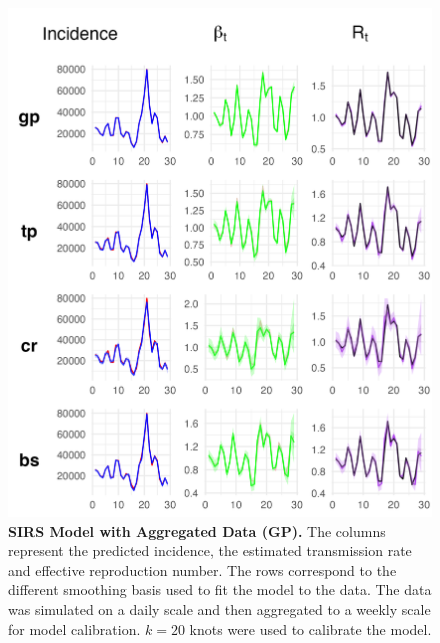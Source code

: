 \documentclass[
11pt, %
oneside, %
english, %
singlespacing, %
]{macthesis} %
\begin{document}
\begin{figure}[H]
\centering
\includegraphics[width=\textwidth]{figure/Simulated/aggregated/sim_agg_combined_gp.png}
\caption[SIRS model with aggregated data (GP).]{\textbf{SIRS Model with Aggregated Data (GP).} The columns represent the predicted incidence, the estimated transmission rate and effective reproduction number. The rows correspond to the different smoothing basis used to fit the model to the data. The data was simulated on a daily scale and then aggregated to a weekly scale for model calibration. \(k=20\) knots were used to calibrate the model.}
\label{fig:sim_agg_gp}
\end{figure}
\end{document}
